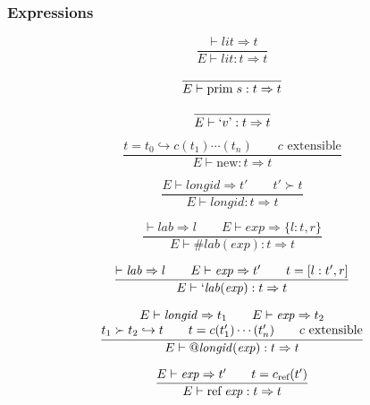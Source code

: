 \documentclass[twoside]{article}
\newcommand{\conarrow}{\hookrightarrow}
\newcommand{\x}[1]{\mathit{#1}}
\newcommand{\f}[1]{\mbox{#1}}
\renewcommand{\c}[1]{c_{\f{\scriptsize #1}}}
\newcommand{\lab}{\x{lab}}
\newcommand{\longid}{\x{longid}}
\newcommand{\lit}{\x{lit}}
\renewcommand{\exp}{\x{exp}}
\begin{document}
\subsubsection*{Expressions \hfill
\fbox{$E \vdash \exp \Rightarrow t$}
}

\begin{equation}
\frac{
\vdash \lit \Rightarrow t
}{
E \vdash \lit : t \Rightarrow t
}
\end{equation}

\begin{equation}
\frac{
}{
E \vdash \f{prim}\;s : t \Rightarrow t
}
\end{equation}

\begin{equation}
\frac{
}{
E \vdash \mbox{`$v$'} : t \Rightarrow t
}
\end{equation}

\begin{equation}
\frac{
t = t_0 \conarrow c(t_1)\cdots(t_n)
\qquad
\mbox{$c$ extensible}
}{
E \vdash \f{new} : t \Rightarrow t
}
\end{equation}

\begin{equation}
\frac{
E \vdash \longid \Rightarrow t'
\qquad
t' \succ t
}{
E \vdash \longid : t \Rightarrow t
}
\end{equation}

\begin{equation}
\frac{
\vdash \lab \Rightarrow l
\qquad
E \vdash \exp \Rightarrow \{l:t,r\}
}{
E \vdash \#\lab(\exp) : t \Rightarrow t
}
\end{equation}

\begin{equation}
\frac{
\vdash \lab \Rightarrow l
\qquad
E \vdash \exp \Rightarrow t'
\qquad
t = [l:t',r]
}{
E \vdash `\lab(\exp) : t \Rightarrow t
}
\end{equation}

\begin{equation}
\frac{
\begin{array}{@{}c@{}}
E \vdash \longid \Rightarrow t_1
\qquad
E \vdash \exp \Rightarrow t_2
\\
t_1 \succ t_2 \conarrow t
\qquad
t = c(t_1')\cdots(t_n')
\qquad
\mbox{$c$ extensible}
\end{array}
}{
E \vdash @\longid(\exp) : t \Rightarrow t
}
\end{equation}

\begin{equation}
\frac{
E \vdash \exp \Rightarrow t'
\qquad
t = \c{ref}(t')
}{
E \vdash \f{ref}\;\exp : t \Rightarrow t
}
\end{equation}
\end{document}
